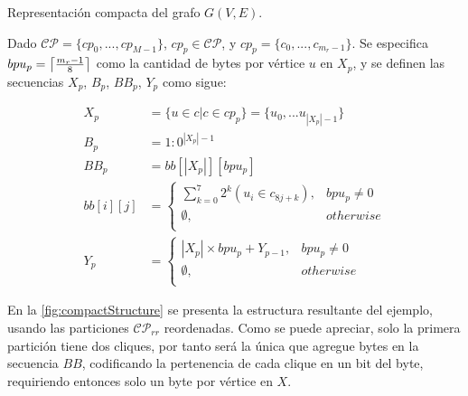 \begin{definition} 
	\label{def:sequences}
	Representación compacta del grafo $G(V, E)$. 
	
	Dado $\mathcal{C}\mathcal{P} = \{cp_{0},...,cp_{M-1}\}$, $cp_{p} \in \mathcal{C}\mathcal{P}$, y $cp_{p}=\{c_{0},...,c_{m_{r}-1}\}$. 
	Se especifica $bpu_{p} = \ceil*{\frac{m_{r}-1}{8}}$ como la cantidad de bytes por vértice $u$ en $X_{p}$, y se definen las secuencias $X_{p}$, $B_{p}$, $BB_{p}$, $Y_{p}$ como sigue:
	
	\begin{align}
		X_{p} &= \{u \in c|c \in cp_{p}\} = \{u_{0},...u_{|X_{p}|-1}\} \\
		B_{p} &= 1:0^{|X_{p}|-1} \\
		BB_{p} &= bb[|X_{p}|][bpu_{p}]   \label{eq:bbp} \\
		bb[i][j] &= \begin{cases}
                  \sum_{k=0}^{7} 2^{k}(u_{i} \in c_{8j+k}), & bpu_{p} \neq 0  \\
                  \emptyset, & otherwise \\
                 \end{cases} \nonumber \\
		Y_{p} &= \begin{cases}
				|X_{p}|\times bpu_{p} + Y_{p-1}, & bpu_{p} \neq 0  \\
				 \emptyset, & otherwise \\
			\end{cases}
	\end{align}
\end{definition}


En la \autoref{fig:compactStructure} se presenta la estructura resultante del ejemplo, usando las particiones $\mathcal{C}\mathcal{P}_{rr}$ reordenadas. Como se puede apreciar, solo la primera partición tiene dos cliques, por tanto será la única que agregue bytes en la secuencia $BB$, codificando la pertenencia de cada clique en un bit del byte, requiriendo entonces solo un byte por vértice en $X$.

